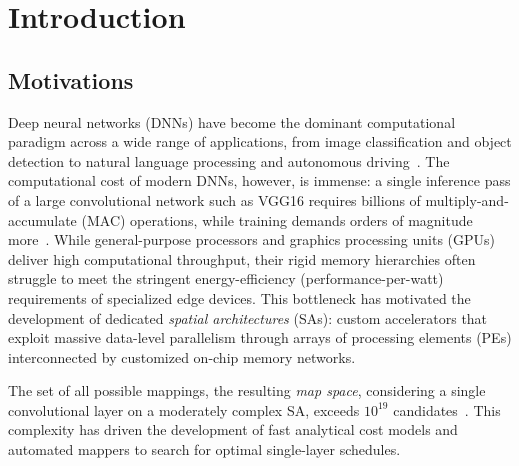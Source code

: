 \chapter{Introduction}
\label{ch:introduction}

\section{Motivations}
\label{sec:intro-motivations}

Deep neural networks (DNNs) have become the dominant computational
paradigm across a wide range of applications, from image classification
and object detection to natural language processing and autonomous
driving~\cite{lecun2015deep}.
The computational cost of modern DNNs, however, is immense: a single
inference pass of a large convolutional network such as VGG16 requires
billions of multiply-and-accumulate (MAC) operations, while training
demands orders of magnitude more~\cite{vgg16}.
While general-purpose processors and graphics processing units (GPUs)
deliver high computational throughput, their rigid memory hierarchies
often struggle to meet the stringent energy-efficiency (performance-per-watt)
requirements of specialized edge devices. This bottleneck has motivated the development of dedicated
\emph{spatial architectures} (SAs): custom accelerators that exploit
massive data-level parallelism through arrays of processing elements (PEs)
interconnected by customized on-chip memory networks.

The set of all possible mappings, the resulting \emph{map space}, considering a single convolutional layer on a moderately complex SA, exceeds $10^{19}$ candidates~\cite{Factorflow}. This complexity has driven
the development of fast analytical cost models and automated mappers
to search for optimal single-layer schedules.


